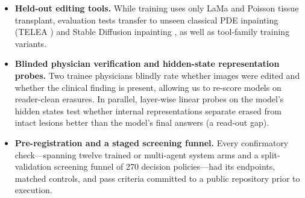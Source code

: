 \documentclass{article} %
\begin{document}
\begin{itemize}[leftmargin=*,nosep]
    \item \textbf{Held-out editing tools.} While training uses only LaMa and Poisson tissue transplant, evaluation tests transfer to unseen classical PDE inpainting (TELEA \citep{telea2004image}) and Stable Diffusion inpainting \citep{rombach2022high}, as well as tool-family training variants.
    \item \textbf{Blinded physician verification and hidden-state representation probes.} Two trainee physicians blindly rate whether images were edited and whether the clinical finding is present, allowing us to re-score models on reader-clean erasures. In parallel, layer-wise linear probes \citep{alain2016understanding} on the model's hidden states test whether internal representations separate erased from intact lesions better than the model's final answers (a read-out gap).
    \item \textbf{Pre-registration and a staged screening funnel.} Every confirmatory check---spanning twelve trained or multi-agent system arms and a split-validation screening funnel of 270 decision policies---had its endpoints, matched controls, and pass criteria committed to a public repository prior to execution.
\end{itemize}
\end{document}
